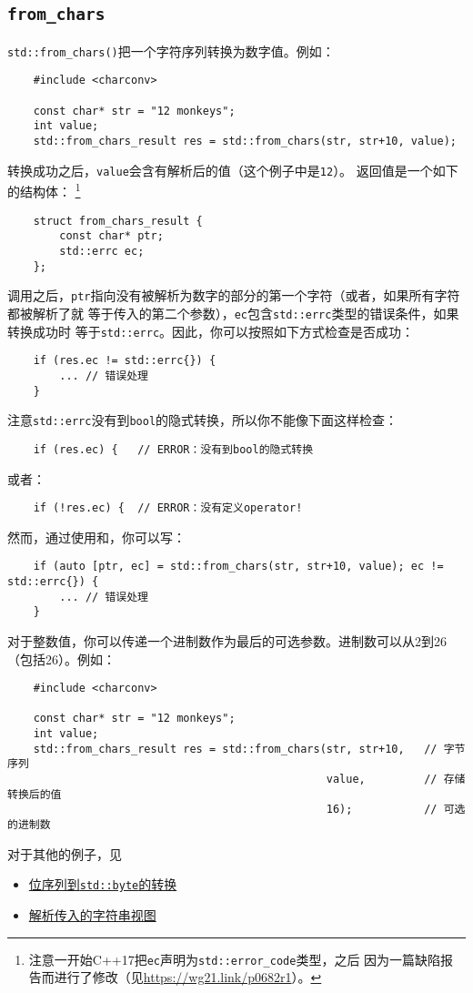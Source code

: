 \subsection{\texttt{from\_chars}}\label{ch31.2.1}
\texttt{std::from\_chars()}把一个字符序列转换为数字值。例如：
\begin{lstlisting}
    #include <charconv>

    const char* str = "12 monkeys";
    int value;
    std::from_chars_result res = std::from_chars(str, str+10, value);
\end{lstlisting}
转换成功之后，\texttt{value}会含有解析后的值（这个例子中是\texttt{12}）。
返回值是一个如下的结构体：
\footnote{注意一开始C++17把\texttt{ec}声明为\texttt{std::error\_code}类型，之后
因为一篇缺陷报告而进行了修改（见\url{https://wg21.link/p0682r1}）。}
\begin{lstlisting}
    struct from_chars_result {
        const char* ptr;
        std::errc ec;
    };
\end{lstlisting}
调用之后，\texttt{ptr}指向没有被解析为数字的部分的第一个字符（或者，如果所有字符都被解析了就
等于传入的第二个参数），\texttt{ec}包含\texttt{std::errc}类型的错误条件，如果转换成功时
等于\texttt{std::errc{}}。因此，你可以按照如下方式检查是否成功：
\begin{lstlisting}
    if (res.ec != std::errc{}) {
        ... // 错误处理
    }
\end{lstlisting}
注意\texttt{std::errc}没有到\texttt{bool}的隐式转换，所以你不能像下面这样检查：
\begin{lstlisting}
    if (res.ec) {   // ERROR：没有到bool的隐式转换
\end{lstlisting}
或者：
\begin{lstlisting}
    if (!res.ec) {  // ERROR：没有定义operator!
\end{lstlisting}
然而，通过使用和，你可以写：
\begin{lstlisting}
    if (auto [ptr, ec] = std::from_chars(str, str+10, value); ec != std::errc{}) {
        ... // 错误处理
    }
\end{lstlisting}
对于整数值，你可以传递一个进制数作为最后的可选参数。进制数可以从2到26（包括26）。例如：
\begin{lstlisting}
    #include <charconv>

    const char* str = "12 monkeys";
    int value;
    std::from_chars_result res = std::from_chars(str, str+10,   // 字节序列
                                                 value,         // 存储转换后的值
                                                 16);           // 可选的进制数
\end{lstlisting}
对于其他的例子，见
\begin{itemize}
    \item \hyperref[位序列到byte]{位序列到\texttt{std::byte}的转换}
    \item \hyperref[改进asInt]{解析传入的字符串视图}
\end{itemize}

